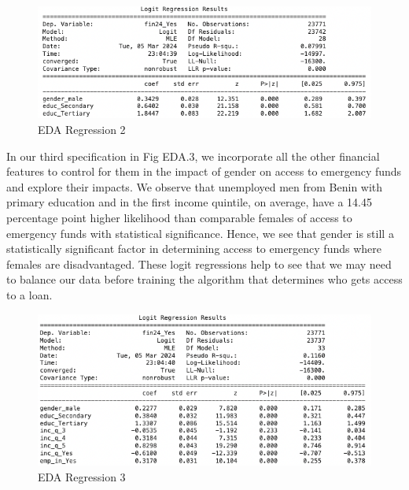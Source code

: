 \documentclass[12pt]{article}
\begin{document}
\begin{figure}

{\centering \includegraphics[width=1\linewidth]{graphs/eda2} 

}

\caption{EDA Regression 2}\label{fig:unnamed-chunk-15}
\end{figure}

In our third specification in Fig EDA.3, we incorporate all the other
financial features to control for them in the impact of gender on access
to emergency funds and explore their impacts. We observe that unemployed
men from Benin with primary education and in the first income quintile,
on average, have a 14.45 percentage point higher likelihood than
comparable females of access to emergency funds with statistical
significance. Hence, we see that gender is still a statistically
significant factor in determining access to emergency funds where
females are disadvantaged. These logit regressions help to see that we
may need to balance our data before training the algorithm that
determines who gets access to a loan.

\begin{figure}

{\centering \includegraphics[width=1\linewidth]{graphs/eda3} 

}

\caption{EDA Regression 3}\label{fig:unnamed-chunk-16}
\end{figure}
\end{document}
